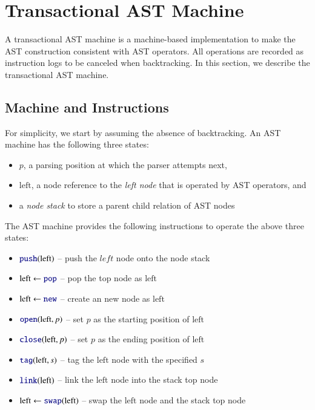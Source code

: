 \documentclass[JIP]{ipsj}
\begin{document}
\section{Transactional AST Machine}

A transactional AST machine is a machine-based implementation to make the  AST construction consistent with AST operators. All operations are recorded as instruction logs to be canceled when backtracking. In this section, we describe the transactional AST machine.

\subsection{Machine and Instructions}

For simplicity, we start by assuming the absence of backtracking. An AST machine has the following three states: 

\begin{itemize}
\item $p$, a parsing position at which the parser attempts next,
\item $\textrm{left}$, a node reference to the {\em left node} that is operated by AST operators, and
\item a {\em node stack} to store a parent child relation of AST nodes
\end{itemize}

The AST machine provides the following instructions to operate the above three states:

\begin{itemize}
\item $\kw{push}(\textrm{left})$ -- push the $left$ node onto the node stack
\item $\textrm{left} \leftarrow \kw{pop}$ -- pop the top node as $\textrm{left}$
\item $\textrm{left} \leftarrow \kw{new}$ -- create an new node as $\textrm{left}$
\item $\kw{open}(\textrm{left},p)$ -- set $p$ as the starting position of $\textrm{left}$
\item $\kw{close}(\textrm{left},p)$ -- set $p$ as the ending position of $\textrm{left}$
\item $\kw{tag}(\textrm{left},s)$ -- tag the $\textrm{left}$ node with the specified $s$ 
\item $\kw{link}(\textrm{left})$ -- link the $\textrm{left}$ node into the stack top node
\item $\textrm{left} \leftarrow \kw{swap}(\textrm{left})$ -- swap the $\textrm{left}$ node and the stack top node
\end{itemize}
\end{document}
